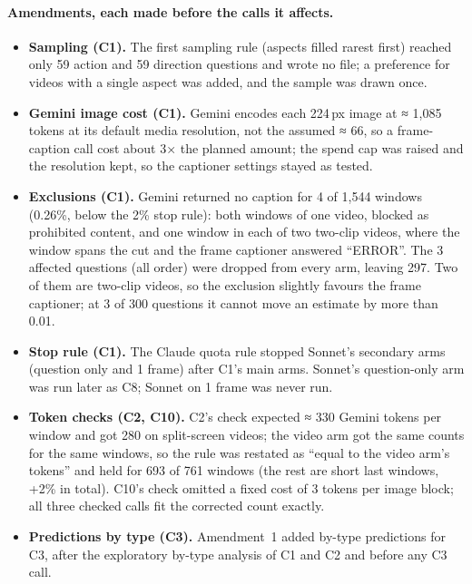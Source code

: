 \documentclass[11pt]{article}
\begin{document}
\paragraph{Amendments, each made before the calls it affects.}
\begin{itemize}
\item \textbf{Sampling (C1).} The first sampling rule (aspects filled rarest first) reached only 59 action and 59 direction questions and wrote no file; a preference for videos with a single aspect was added, and the sample was drawn once.
\item \textbf{Gemini image cost (C1).} Gemini encodes each 224\,px image at ≈ 1,085 tokens at its default media resolution, not the assumed ≈ 66, so a frame-caption call cost about 3× the planned amount; the spend cap was raised and the resolution kept, so the captioner settings stayed as tested.
\item \textbf{Exclusions (C1).} Gemini returned no caption for 4 of 1,544 windows (0.26\%, below the 2\% stop rule): both windows of one video, blocked as prohibited content, and one window in each of two two-clip videos, where the window spans the cut and the frame captioner answered ``ERROR''. The 3 affected questions (all order) were dropped from every arm, leaving 297. Two of them are two-clip videos, so the exclusion slightly favours the frame captioner; at 3 of 300 questions it cannot move an estimate by more than 0.01.
\item \textbf{Stop rule (C1).} The Claude quota rule stopped Sonnet's secondary arms (question only and 1 frame) after C1's main arms. Sonnet's question-only arm was run later as C8; Sonnet on 1 frame was never run.
\item \textbf{Token checks (C2, C10).} C2's check expected ≈ 330 Gemini tokens per window and got 280 on split-screen videos; the video arm got the same counts for the same windows, so the rule was restated as ``equal to the video arm's tokens'' and held for 693 of 761 windows (the rest are short last windows, +2\% in total). C10's check omitted a fixed cost of 3 tokens per image block; all three checked calls fit the corrected count exactly.
\item \textbf{Predictions by type (C3).} Amendment~1 added by-type predictions for C3, after the exploratory by-type analysis of C1 and C2 and before any C3 call.
\end{itemize}
\end{document}
